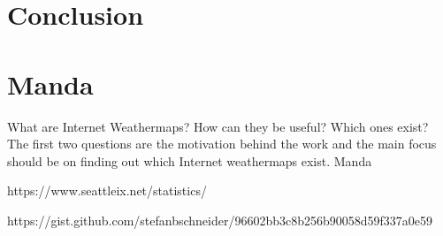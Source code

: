 \documentclass[sigconf,authorversion,nonacm]{acmart}
\begin{document}
\section{Conclusion}




\appendix

\section{Manda}
What are Internet Weathermaps?
How can they be useful?
Which ones exist?
The first two questions are the motivation behind the work and the main focus should be on finding out which Internet weathermaps exist.
Manda

https://www.seattleix.net/statistics/

https://gist.github.com/stefanbschneider/96602bb3c8b256b90058d59f337a0e59
\end{document}
